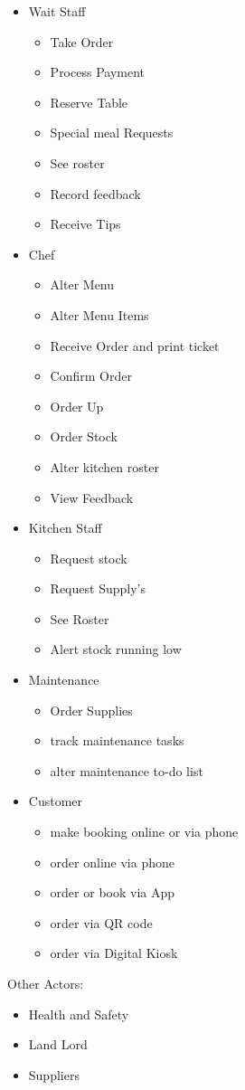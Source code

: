 \documentclass{article}
\begin{document}
\begin{itemize}
    \item {Wait Staff}
    \begin{itemize}
        \item {Take Order}
        \item {Process Payment}
        \item {Reserve Table}
        \item {Special meal Requests}
        \item See roster
        \item Record feedback
        \item Receive Tips
    \end{itemize}
    \item {Chef}
    \begin{itemize}
        \item Alter Menu
        \item Alter Menu Items
        \item Receive Order and print ticket
        \item Confirm Order
        \item Order Up
        \item Order Stock
        \item Alter kitchen roster
        \item View Feedback
    \end{itemize}
    \item {Kitchen Staff}
    \begin{itemize}
        \item Request stock
        \item Request Supply's
        \item See Roster
        \item Alert stock running low
    \end{itemize}
    \item {Maintenance}
    \begin{itemize}
        \item Order Supplies
        \item track maintenance tasks
        \item alter maintenance to-do list
    \end{itemize}
    \item {Customer}
    \begin{itemize}
        \item make booking online or via phone
        \item order online via phone
        \item order or book via App
        \item order via QR code
        \item order via Digital Kiosk
    \end{itemize}
\end{itemize}
Other Actors:
\begin{itemize}
    \item {Health and Safety}
    \item {Land Lord}
    \item {Suppliers}
\end{itemize}
\end{document}

